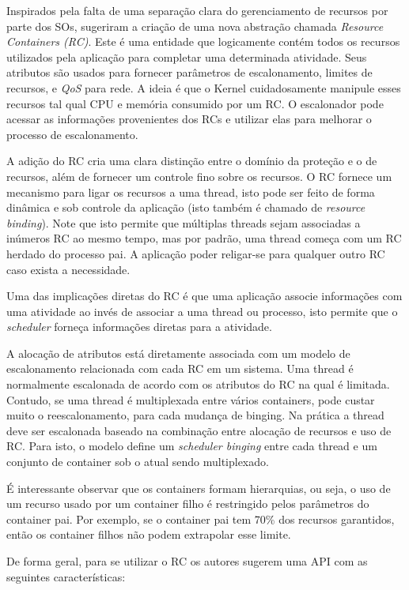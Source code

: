 Inspirados pela falta de uma separação clara do gerenciamento de recursos por
parte dos SOs, \cite{resourcecontainers} sugeriram a criação de uma nova
abstração chamada \emph{Resource Containers (RC)}. Este é uma entidade que
logicamente contém todos os recursos utilizados pela aplicação para completar
uma determinada atividade. Seus atributos são usados para fornecer parâmetros
de escalonamento, limites de recursos, e \emph{QoS} para rede. A ideia é que o
Kernel cuidadosamente manipule esses recursos tal qual CPU e memória consumido
por um RC. O escalonador pode acessar as informações provenientes dos RCs e
utilizar elas para melhorar o processo de escalonamento.

A adição do RC cria uma clara distinção entre o domínio da proteção e o de
recursos, além de fornecer um controle fino sobre os recursos. O RC fornece um
mecanismo para ligar os recursos a uma thread, isto pode ser feito de forma
dinâmica e sob controle da aplicação (isto também é chamado de \emph{resource
binding}). Note que isto permite que múltiplas threads sejam associadas a
inúmeros RC ao mesmo tempo, mas por padrão, uma thread começa com um RC herdado
do processo pai. A aplicação poder religar-se para qualquer outro RC caso
exista a necessidade.

Uma das implicações diretas do RC é que uma aplicação associe informações com
uma atividade ao invés de associar a uma thread ou processo, isto permite que
o \emph{scheduler} forneça informações diretas para a atividade.

A alocação de atributos está diretamente associada com um modelo de
escalonamento relacionada com cada RC em um sistema. Uma thread é normalmente
escalonada de acordo com os atributos do RC na qual é limitada. Contudo,
se uma thread é multiplexada entre vários containers, pode custar muito o
reescalonamento, para cada mudança de binging. Na prática a thread deve ser
escalonada baseado na combinação entre alocação de recursos e uso de
RC. Para isto, o modelo define um \emph{scheduler binging} entre cada
thread e um conjunto de container sob o atual sendo multiplexado. 

É interessante observar que os containers formam hierarquias, ou seja, o uso de
um recurso usado por um container filho é restringido pelos parâmetros do
container pai. Por exemplo, se o container pai tem 70\% dos recursos
garantidos, então os container filhos não podem extrapolar esse limite.

De forma geral, para se utilizar o RC os autores sugerem uma API com as
seguintes características:

